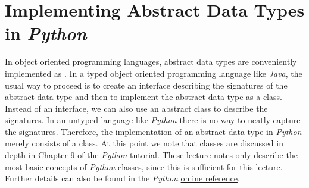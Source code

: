 \section[Implementation]{Implementing Abstract Data Types in \textsl{Python}}
In object oriented programming languages, abstract data types are conveniently implemented as
.  In a typed object oriented programming language like \textsl{Java}, the usual way to proceed
is to create an interface describing the signatures of the abstract data type and then to implement
the abstract data type as a class.  Instead of an interface, we can also use an abstract class
to describe the signatures.  In an untyped language like \textsl{Python} there is no way to
neatly capture the signatures.  Therefore, the implementation of an abstract data type in
\textsl{Python} merely consists of a class.  At this point we note that classes are discussed in depth in
Chapter 9 of the \textsl{Python}  \href{https://docs.python.org/3.6/tutorial/classes.html}{tutorial}.  These
lecture notes only describe the most basic concepts of \textsl{Python} classes, since this is sufficient for this
lecture.  Further details can also be found in the \textsl{Python}
\href{https://docs.python.org/3.6/reference/index.html}{online reference}. 


